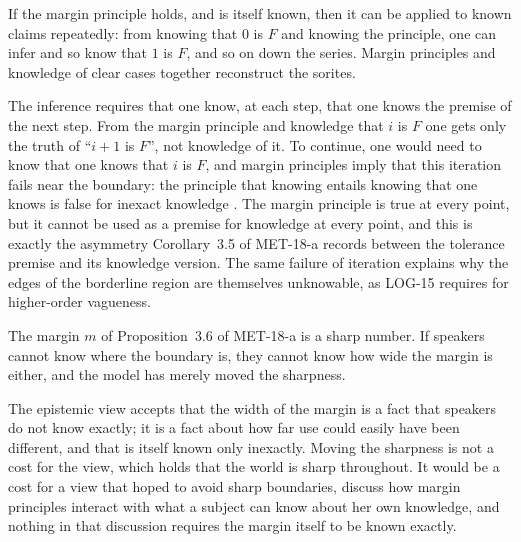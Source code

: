 \documentclass{situationist-preprint}
\begin{document}
\begin{objection}[Iteration]\label{o:iter}
If the margin principle holds, and is itself known, then it can be applied to known claims repeatedly: from knowing that $0$ is $F$ and knowing the principle, one can infer and so know that $1$ is $F$, and so on down the series. Margin principles and knowledge of clear cases together reconstruct the sorites.
\end{objection}

\begin{reply}
The inference requires that one know, at each step, that one knows the premise of the next step. From the margin principle and knowledge that $i$ is $F$ one gets only the truth of \enquote{$i+1$ is $F$}, not knowledge of it. To continue, one would need to know that one knows that $i$ is $F$, and margin principles imply that this iteration fails near the boundary: the principle that knowing entails knowing that one knows is false for inexact knowledge \citep[ch.~5]{Williamson2000}. The margin principle is true at every point, but it cannot be used as a premise for knowledge at every point, and this is exactly the asymmetry Corollary~3.5 of MET-18-a records between the tolerance premise and its knowledge version. The same failure of iteration explains why the edges of the borderline region are themselves unknowable, as LOG-15 requires for higher-order vagueness.
\end{reply}

\begin{objection}
The margin $m$ of Proposition~3.6 of MET-18-a is a sharp number. If speakers cannot know where the boundary is, they cannot know how wide the margin is either, and the model has merely moved the sharpness.
\end{objection}

\begin{reply}
The epistemic view accepts that the width of the margin is a fact that speakers do not know exactly; it is a fact about how far use could easily have been different, and that is itself known only inexactly. Moving the sharpness is not a cost for the view, which holds that the world is sharp throughout. It would be a cost for a view that hoped to avoid sharp boundaries, \citet{DokicEgre2009} discuss how margin principles interact with what a subject can know about her own knowledge, and nothing in that discussion requires the margin itself to be known exactly.
\end{reply}
\end{document}
